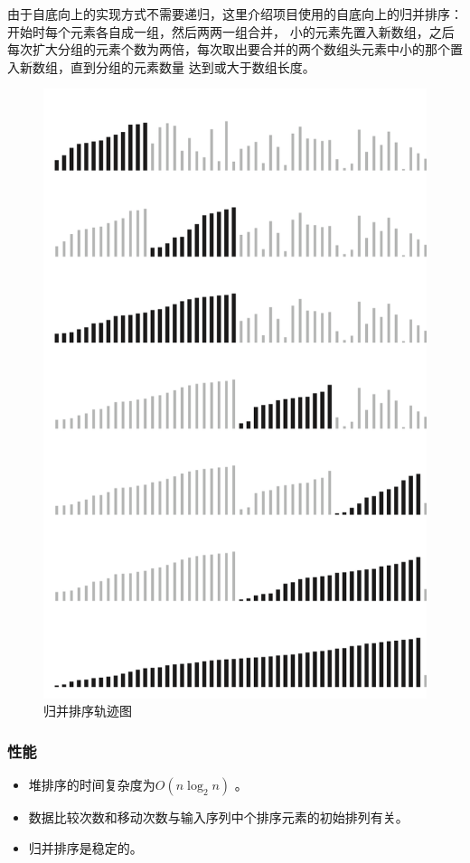 由于自底向上的实现方式不需要递归，这里介绍项目使用的自底向上的归并排序：开始时每个元素各自成一组，然后两两一组合并，%
小的元素先置入新数组，之后每次扩大分组的元素个数为两倍，每次取出要合并的两个数组头元素中小的那个置入新数组，直到分组的元素数量%
达到或大于数组长度。


\begin{figure}[H]
    \centering
    \includegraphics[width=12.5cm]{src/mergeTrace.png}
    \caption{归并排序轨迹图}
\end{figure}

\subsubsection{性能}
\begin{itemize}
    \item 堆排序的时间复杂度为$O(n\log_2{n})$ 。
    \item 数据比较次数和移动次数与输入序列中个排序元素的初始排列有关。
    \item 归并排序是稳定的。
\end{itemize}

